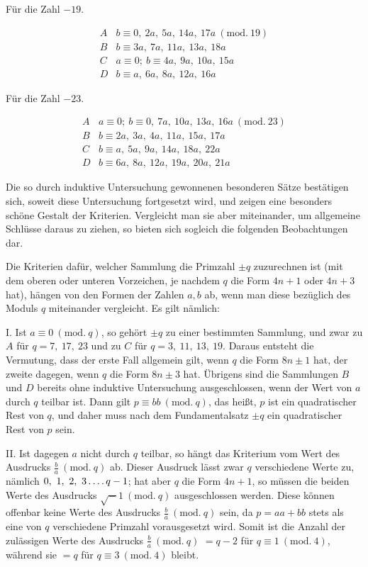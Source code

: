 %
\begin{center}Für die Zahl $-19$.\end{center}
\[
\begin{array}{c|l}
A&b\equiv0,\ 2a,\ 5a,\ 14a,\ 17a\ (\mathrm{mod.}\ 19)\\
B&b\equiv3a,\ 7a,\ 11a,\ 13a,\ 18a\\
C&a\equiv0;\ b\equiv4a,\ 9a,\ 10a,\ 15a\\
D&b\equiv a,\ 6a,\ 8a,\ 12a,\ 16a
\end{array}
\]

\begin{center}Für die Zahl $-23$.\end{center}
\[
\begin{array}{c|l}
A&a\equiv0;\ b\equiv0,\ 7a,\ 10a,\ 13a,\ 16a\ (\mathrm{mod.}\ 23)\\
B&b\equiv2a,\ 3a,\ 4a,\ 11a,\ 15a,\ 17a\\
C&b\equiv a,\ 5a,\ 9a,\ 14a,\ 18a,\ 22a\\
D&b\equiv6a,\ 8a,\ 12a,\ 19a,\ 20a,\ 21a
\end{array}
\]

Die so durch induktive Untersuchung gewonnenen besonderen Sätze bestätigen sich, soweit diese Untersuchung fortgesetzt wird, und zeigen eine besonders schöne Gestalt der Kriterien. Vergleicht man sie aber miteinander, um allgemeine Schlüsse daraus zu ziehen, so bieten sich sogleich die folgenden Beobachtungen dar.

Die Kriterien dafür, welcher Sammlung die Primzahl $\pm q$ zuzurechnen ist (mit dem oberen oder unteren Vorzeichen, je nachdem $q$ die Form $4n+1$ oder $4n+3$ hat), hängen von den Formen der Zahlen $a,b$ ab, wenn man diese bezüglich des Moduls $q$ miteinander vergleicht. Es gilt nämlich:

I. Ist $a\equiv0\ (\mathrm{mod.}\ q)$, so gehört $\pm q$ zu einer bestimmten Sammlung, und zwar zu $A$ für $q=7,\ 17,\ 23$ und zu $C$ für $q=3,\ 11,\ 13,\ 19$. Daraus entsteht die Vermutung, dass der erste Fall allgemein gilt, wenn $q$ die Form $8n\pm1$ hat, der zweite dagegen, wenn $q$ die Form $8n\pm3$ hat. Übrigens sind die Sammlungen $B$ und $D$ bereits ohne induktive Untersuchung ausgeschlossen, wenn der Wert von $a$ durch $q$ teilbar ist. Dann gilt $p\equiv bb\ (\mathrm{mod.}\ q)$, das heißt, $p$ ist ein quadratischer Rest von $q$, und daher muss nach dem Fundamentalsatz $\pm q$ ein quadratischer Rest von $p$ sein.

II. Ist dagegen $a$ nicht durch $q$ teilbar, so hängt das Kriterium vom Wert des Ausdrucks $\frac ba\ (\mathrm{mod.}\ q)$ ab. Dieser Ausdruck lässt zwar $q$ verschiedene Werte zu, nämlich $0,\ 1,\ 2,\ 3\dotsfour q-1$; hat aber $q$ die Form $4n+1$, so müssen die beiden
%
Werte des Ausdrucks $\surd-1\ (\mathrm{mod.}\ q)$ ausgeschlossen werden. Diese können offenbar keine Werte des Ausdrucks $\frac ba\ (\mathrm{mod.}\ q)$ sein, da $p=aa+bb$ stets als eine von $q$ verschiedene Primzahl vorausgesetzt wird. Somit ist die Anzahl der zulässigen Werte des Ausdrucks $\frac ba\ (\mathrm{mod.}\ q)$ $=q-2$ für $q\equiv1\ (\mathrm{mod.}\ 4)$, während sie $=q$ für $q\equiv3\ (\mathrm{mod.}\ 4)$ bleibt.

